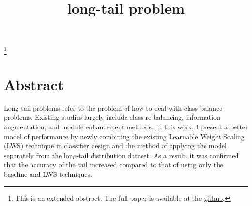 \documentclass[extendedabs]{bmvc2k}
\begin{document}
\title{long-tail problem}
\maketitle
\let\thefootnote\relax\footnote{This is an extended abstract. The full paper is available at the \href{https://github.com/LeeGwanHui/TIL/tree/main/deeplearning_ham}{github}. }
\vspace{-0.2in}

\section{Abstract}
  \quad Long-tail problems refer to the problem of how to deal with class balance problems. Existing studies largely include class re-balancing, 
  information augmentation, and module enhancement methods. In this work, I present a better model of performance by newly combining the existing Learnable Weight Scaling (LWS) 
  technique in classifier design and the method of applying the model separately from the long-tail distribution dataset.
  As a result, it was confirmed that the accuracy of the tail increased compared to that of using only the baseline and LWS techniques.
\end{document}
